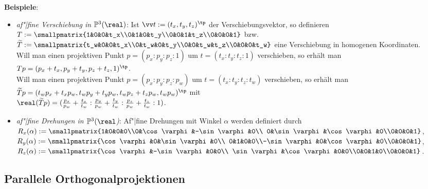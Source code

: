 \textbf{Beispiele}:
\begin{itemize}
    \item
    \emph{af"|fine Verschiebung in $\PP^3(\real)$}:
    Ist $\vec{t} := (t_x, t_y, t_z)^\tp$ der Verschiebungsvektor, so definieren
    $T := \smallpmatrix{1&0&0&t_x\\0&1&0&t_y\\0&0&1&t_z\\0&0&0&1}$ bzw.
    $\widetilde{T} := \smallpmatrix{t_w&0&0&t_x\\0&t_w&0&t_y\\0&0&t_w&t_z\\0&0&0&t_w}$
    eine Verschiebung in homogenen Koordinaten.\\
    Will man einen projektiven Punkt $p = (p_x:p_y:p_z:1)$ um $t = (t_x:t_y:t_z:1)$ verschieben,
    so erhält man $Tp = (p_x + t_x, p_y + t_y, p_z + t_z, 1)^\tp$.\\
    Will man einen projektiven Punkt $p = (p_x:p_y:p_z:p_w)$ um $t = (t_x:t_y:t_z:t_w)$
    verschieben, so erhält man $\widetilde{T}p
    = (t_w p_x + t_x p_w, t_w p_y + t_y p_w, t_w p_z + t_z p_w, t_w p_w)^\tp$ mit\\
    $\real(\widetilde{T}p) = (\frac{p_x}{p_w} + \frac{t_x}{t_w} :
    \frac{p_y}{p_w} + \frac{t_y}{t_w} : \frac{p_z}{p_w} + \frac{t_z}{t_w} : 1)$.

    \item
    \emph{af"|fine Drehungen in $\PP^3(\real$)}:
    Af"|fine Drehungen mit Winkel $\alpha$ werden definiert durch\\
    $R_x(\alpha) := \smallpmatrix{1&0&0&0\\0&\cos\varphi&-\sin\varphi&0\\
    0&\sin\varphi&\cos\varphi&0\\0&0&0&1}$,
    $R_y(\alpha) := \smallpmatrix{\cos\varphi&0&\sin\varphi&0\\
    0&1&0&0\\-\sin\varphi&0&\cos\varphi&0\\0&0&0&1}$,
    $R_z(\alpha) := \smallpmatrix{\cos\varphi&-\sin\varphi&0&0\\
    \sin\varphi&\cos\varphi&0&0\\0&0&1&0\\0&0&0&1}$.
\end{itemize}

\pagebreak

\subsection{%
    Parallele Orthogonalprojektionen%
}

